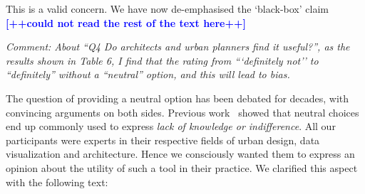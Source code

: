 \documentclass{paper}
\newenvironment{myquote}
{\definecolor{shadecolor}{rgb}{0.9,0.95,1} \begin{shaded*} \sf \em}
{\em\end{shaded*}}
\newcommand{\ns}[1]{\textcolor{red}{NS: #1}}
\begin{document}
\noindent This is a valid concern. We have now de-emphasised the `black-box' claim \textcolor{blue}{\textbf{[++could not read the rest of the text here++]}}


\begin{myquote}
\noindent Comment: About ``Q4 Do architects and urban planners find it useful?'', as the results shown in Table 6, I find that the rating from ```definitely not'' to ``definitely'' without a ``neutral'' option, and this will lead to bias.
\end{myquote}

\noindent The question of providing a neutral option has been debated for decades, with convincing arguments on both sides. Previous work~\cite{Agree2012,moors2008exploring} showed that neutral choices end up commonly used to express \textit{lack of knowledge or indifference}. All our participants were experts in their respective fields of urban design, data visualization and architecture. Hence we consciously wanted them to express an opinion about the utility of such a tool in their practice. We clarified this aspect with the following text:
\end{document}
